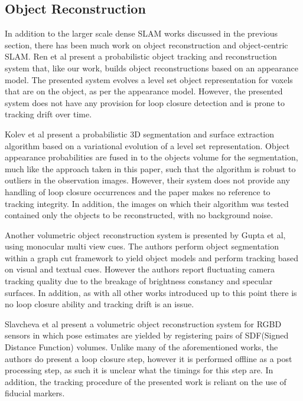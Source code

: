 \subsection{Object Reconstruction}

In addition to the larger scale dense SLAM works discussed in the previous section, there has been much work on object reconstruction and 
object-centric SLAM. Ren et al \cite{Ren2013} present a probabilistic object tracking and reconstruction system that, like our work, builds 
object reconstructions based on an appearance model. The presented system evolves a level set object representation for voxels that 
are on the object, as per the appearance model. However, the presented system does not have any provision for loop closure detection and 
is prone to tracking drift over time.

Kolev et al present a probabilistic 3D segmentation and surface extraction algorithm\cite{Kolev2006} based on a variational evolution of a level 
set representation. Object appearance probabilities are fused in to the objects volume for the segmentation, much like the approach taken in 
this paper, such that the algorithm is robust to outliers in the observation images. However, their system does not provide any handling of 
loop closure occurrences and the paper makes no reference to tracking integrity. In addition, the images on which their algorithm was tested 
contained only the objects to be reconstructed, with no background noise.

Another volumetric object reconstruction system is presented by Gupta et al\cite{Gupta2016}, using monocular multi view cues. The authors 
perform object segmentation within a graph cut framework to yield object models and perform tracking based on visual and textual cues. 
However the authors report fluctuating camera tracking quality due to the breakage of brightness constancy and specular surfaces. In addition, 
as with all other works introduced up to this point there is no loop closure ability and tracking drift is an issue.

Slavcheva et al present a volumetric object reconstruction system for RGBD sensors in which pose estimates are yielded by registering pairs of 
SDF(Signed Distance Function) volumes. Unlike many of the aforementioned works, the authors do present a loop closure step, however it is 
performed offline as a post processing step, as such it is unclear what the timings for this step are.  
In addition, the tracking procedure of the presented work is reliant on the use of fiducial markers.

